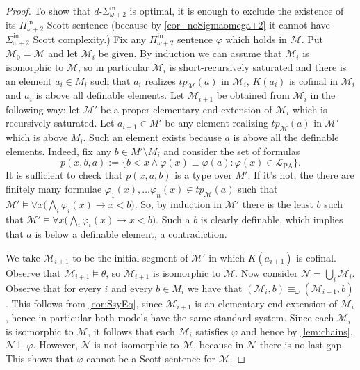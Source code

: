 \documentclass[11pt]{amsart}
\newcommand{\mc}[1]{\mathcal{#1}}
\newcommand{\Pinf}[1]{\Pi^{\mathrm{in}}_{#1}}
\newcommand{\Sinf}[1]{\Sigma^{\mathrm{in}}_{#1}}
\newcommand{\dSinf}[1]{d\text{-}\Sigma^{\mathrm{in}}_{#1}}
\newcommand{\PA}{\mathrm{PA}}
\renewcommand{\phi}{\varphi}
\theoremstyle{remark}
\begin{document}
\begin{proof}
    To show that $\dSinf{\omega +2}$ is optimal, it is enough to exclude the existence of its $\Pinf{\omega+2}$ Scott sentence (because by \cref{cor_noSigmaomega+2} it cannot have  $\Sinf{\omega+2}$ Scott complexity.)  Fix any $\Pinf{\omega+2}$ sentence $\phi$ which holds in $\mc{M}$. Put $\mc{M}_0 = \mc{M}$ and let $\mc{M}_i$ be given. By induction we can assume that $\mc{M}_i$ is isomorphic to $\mc{M}$, so in particular $\mc{M}_i$ is short-recursively saturated and there is an element $a_i\in M_i$ such that $a_i$ realizes $tp_{\mc{M}}(a)$ in $\mc{M}_i$, $K(a_i)$ is cofinal in $\mc{M}_i$ and $a_i$ is above all definable elements. Let $\mc{M}_{i+1}$ be obtained from $\mc{M}_i$ in the following way: let $\mc{M}'$ be a proper elementary end-extension of $\mc{M}_i$ which is recursively saturated.  Let $a_{i+1}\in M'$ be any element realizing $tp_{\mc{M}}(a)$ in $\mc{M}'$ which is above $M_{i}$. Such an element exists because $a$ is above all the definable elements. Indeed, fix any $b\in M'\setminus M_i$ and consider the set of formulas
    \[p(x,b,a):= \{b<x \wedge \phi(x)\equiv \phi(a) : \phi(x)\in \mc{L}_{\PA}\}.\]
    It is sufficient to check that $p(x,a,b)$ is a type over $M'$. If it's not, the there are finitely many formulae $\phi_1(x),\ldots \phi_n(x)\in tp_{\mc{M}}(a)$ such that $\mc{M}'\models \forall x \bigl(\bigwedge_i\phi_i(x)\rightarrow x<b\bigr)$. So, by induction in $\mc{M}'$ there is the least $b$ such that $\mc{M}'\models \forall x \bigl(\bigwedge_i\phi_i(x)\rightarrow x<b\bigr)$. Such a $b$ is clearly definable, which implies that $a$ is below a definable element, a contradiction.

    We take $\mc{M}_{i+1}$ to be the initial segment of $\mc{M}'$ in which $K(a_{i+1})$ is cofinal. Observe that $\mc{M}_{i+1}\vDash \theta$, so $\mc{M}_{i+1}$ is isomorphic to $\mc{M}$. Now consider $\mc{N} = \bigcup_i\mc{M}_i$. Observe that for every $i$ and every $b\in M_{i}$ we have that $(\mc{M}_i,b)\equiv_{\omega}(\mc{M}_{i+1},b)$. This follows from \cref{cor:SsyEq}, since $\mc{M}_{i+1}$ is an elementary end-extension of $\mc{M}_i$, hence in particular both models have the same standard system. Since each $\mc{M}_i$ is isomorphic to $\mc{M}$, it follows that each $\mc{M}_i$ satisfies $\phi$ and hence by \cref{lem:chains}, $\mc{N}\models \phi$. However, $\mc{N}$ is not isomorphic to $\mc{M}$, because in $\mc{N}$ there is no last gap. This shows that $\phi$ cannot be a Scott sentence for $\mc{M}$.
\end{proof}






\printbibliography
\end{document}
